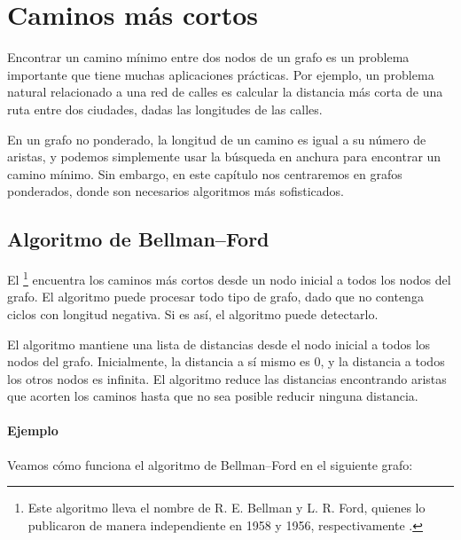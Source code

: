 \chapter{Caminos más cortos}


Encontrar un camino mínimo entre dos nodos de un grafo
es un problema importante que tiene muchas aplicaciones prácticas.
Por ejemplo, un problema natural relacionado a una red de calles
es calcular la distancia más corta de una ruta entre dos ciudades,
dadas las longitudes de las calles.

En un grafo no ponderado, la longitud de un camino es igual
a su número de aristas, y podemos simplemente usar la búsqueda en
anchura para encontrar un camino mínimo. Sin embargo, en este
capítulo nos centraremos en grafos ponderados, donde son necesarios
algoritmos más sofisticados.

\section{Algoritmo de Bellman--Ford}


El \footnote{Este algoritmo lleva
    el nombre de R. E. Bellman y L. R. Ford, quienes lo publicaron
    de manera independiente en 1958 y 1956, respectivamente
    \cite{bel58,for56a}.}
encuentra los caminos más cortos desde un nodo inicial a todos los
nodos del grafo. El algoritmo puede procesar todo tipo de grafo,
dado que no contenga ciclos con longitud negativa. Si es así, el
algoritmo puede detectarlo.

El algoritmo mantiene una lista de distancias desde el nodo inicial
a todos los nodos del grafo. Inicialmente, la distancia a sí mismo
es 0, y la distancia a todos los otros nodos es infinita. El
algoritmo reduce las distancias encontrando aristas que acorten
los caminos hasta que no sea posible reducir ninguna distancia.

\subsubsection{Ejemplo}

Veamos cómo funciona el algoritmo de Bellman--Ford
en el siguiente grafo:

